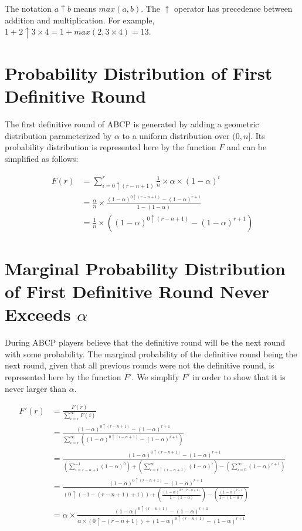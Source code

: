 \documentclass{dalcsthesis}
\begin{document}
The notation $a \uparrow b$ means $max(a, b)$. The $\uparrow$ operator has precedence between addition and multiplication. For example, $1 + 2 \uparrow 3 \times 4 = 1 + max(2, 3 \times 4) = 13$.

\section{Probability Distribution of First Definitive Round}
\label{Appendix:ABCP:Probabilities:FirstDefinitiveRound}

The first definitive round of ABCP is generated by adding a geometric distribution parameterized by $\alpha$ to a uniform distribution over $(0, n]$. Its probability distribution is represented here by the function $F$ and can be simplified as follows:

\begin{align*}
F(r)
  &= \sum_{i=0 \uparrow (r-n+1)}^r \frac{1}{n} \times \alpha \times (1-\alpha)^i
\\&= \frac{\alpha}{n} \times \frac{(1-\alpha)^{0 \uparrow (r-n+1)} - (1-\alpha)^{r+1}}{1 - (1-\alpha)}
\\&= \frac{1}{n} \times ((1-\alpha)^{0 \uparrow (r-n+1)} - (1-\alpha)^{r+1})
\end{align*}

\section{Marginal Probability Distribution of First Definitive Round Never Exceeds $\alpha$}
\label{Appendix:ABCP:Probabilities:MarginalFirstDefinitiveRoundBelowAlpha}

During ABCP players believe that the definitive round will be the next round with some probability. The marginal probability of the definitive round being the next round, given that all previous rounds were not the definitive round, is represented here by the function $F'$. We simplify $F'$ in order to show that it is never larger than $\alpha$.

\begin{align*}
F'(r)
  &= \frac{F(r)}{\sum_{i=r}^{\infty} F(i)}
\\&= \frac{(1-\alpha)^{0 \uparrow (r-n+1)} - (1-\alpha)^{r+1}}{\sum_{i=r}^{\infty} ((1-\alpha)^{0 \uparrow (i-n+1)} - (1-\alpha)^{i+1})}
\\&= \frac{(1-\alpha)^{0 \uparrow (r-n+1)} - (1-\alpha)^{r+1}}{(\sum_{i=r-n+1}^{-1} (1-\alpha)^0) + (\sum_{i=r \uparrow (r-n+1)}^{\infty} (1-\alpha)^i) - (\sum_{i=0}^{\infty} (1-\alpha)^{i+1})}
\\&= \frac{(1-\alpha)^{0 \uparrow (r-n+1)} - (1-\alpha)^{r+1}}{(0 \uparrow (-1 - (r-n+1) + 1)) + (\frac{(1-\alpha)^{0 \uparrow (r-n+1)}}{1 - (1-\alpha)}) - (\frac{(1-\alpha)^{r+1}}{1 - (1-\alpha)})}
\\&= \alpha \times \frac{(1-\alpha)^{0 \uparrow (r-n+1)} - (1-\alpha)^{r+1}}{\alpha \times (0 \uparrow -(r-n+1)) + (1-\alpha)^{0 \uparrow (r-n+1)} - (1-\alpha)^{r+1}}
\end{align*}
\end{document}

